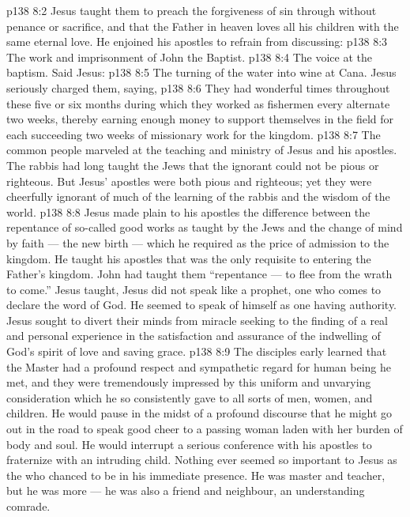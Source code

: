 \vs p138 8:2 Jesus taught them to preach the forgiveness of sin through  without penance or sacrifice, and that the Father in heaven loves all his children with the same eternal love. He enjoined his apostles to refrain from discussing:
\vs p138 8:3 \bibnobreakspace The work and imprisonment of John the Baptist.
\vs p138 8:4 \bibnobreakspace The voice at the baptism. Said Jesus: 
\vs p138 8:5 \bibnobreakspace The turning of the water into wine at Cana. Jesus seriously charged them, saying, 
\vs p138 8:6 \pc They had wonderful times throughout these five or six months during which they worked as fishermen every alternate two weeks, thereby earning enough money to support themselves in the field for each succeeding two weeks of missionary work for the kingdom.
\vs p138 8:7 The common people marveled at the teaching and ministry of Jesus and his apostles. The rabbis had long taught the Jews that the ignorant could not be pious or righteous. But Jesus’ apostles were both pious and righteous; yet they were cheerfully ignorant of much of the learning of the rabbis and the wisdom of the world.
\vs p138 8:8 \pc Jesus made plain to his apostles the difference between the repentance of so\hyp{}called good works as taught by the Jews and the change of mind by faith --- the new birth --- which he required as the price of admission to the kingdom. He taught his apostles that  was the only requisite to entering the Father’s kingdom. John had taught them “repentance --- to flee from the wrath to come.” Jesus taught,  Jesus did not speak like a prophet, one who comes to declare the word of God. He seemed to speak of himself as one having authority. Jesus sought to divert their minds from miracle seeking to the finding of a real and personal experience in the satisfaction and assurance of the indwelling of God’s spirit of love and saving grace.
\vs p138 8:9 The disciples early learned that the Master had a profound respect and sympathetic regard for  human being he met, and they were tremendously impressed by this uniform and unvarying consideration which he so consistently gave to all sorts of men, women, and children. He would pause in the midst of a profound discourse that he might go out in the road to speak good cheer to a passing woman laden with her burden of body and soul. He would interrupt a serious conference with his apostles to fraternize with an intruding child. Nothing ever seemed so important to Jesus as the  who chanced to be in his immediate presence. He was master and teacher, but he was more --- he was also a friend and neighbour, an understanding comrade.
